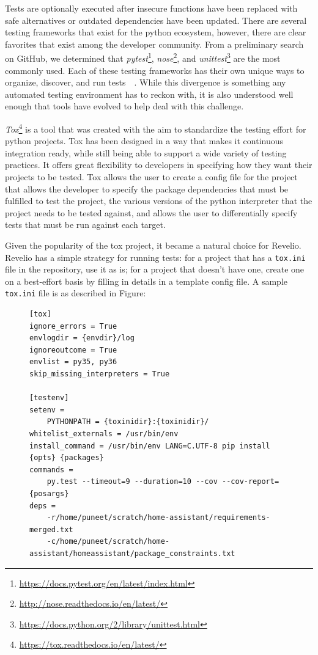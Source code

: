 Tests are optionally executed after insecure functions have been replaced with safe alternatives or outdated dependencies have been updated. There are several testing frameworks that exist for the python ecosystem, however, there are clear favorites that exist among the developer community. From a preliminary search on GitHub, we determined that \emph{pytest}\footnote{\url{https://docs.pytest.org/en/latest/index.html}}, \emph{nose}\footnote{\url{http://nose.readthedocs.io/en/latest/}}, and \emph{unittest}\footnote{\url{https://docs.python.org/2/library/unittest.html}} are the most commonly used. Each of these testing frameworks has their own unique ways to organize, discover, and run tests~\cite{nosetests}~\cite{pytests}. While this divergence is something any automated testing environment has to reckon with, it is also understood well enough that tools have evolved to help deal with this challenge.

\emph{Tox}\footnote{\url{https://tox.readthedocs.io/en/latest/}} is a tool that was created with the aim to standardize the testing effort for python projects. Tox has been designed in a way that makes it continuous integration ready, while still being able to support a wide variety of testing practices. It offers great flexibility to developers in specifying how they want their projects to be tested. Tox allows the user to create a config file for the project that allows the developer to specify the package dependencies that must be fulfilled to test the project, the various versions of the python interpreter that the project needs to be tested against, and allows the user to differentially specify tests that must be run against each target. 

Given the popularity of the tox project, it became a natural choice for Revelio. Revelio has a simple strategy for running tests: for a project that has a \texttt{tox.ini} file in the repository, use it as is; for a project that doesn't have one, create one on a best-effort basis by filling in details in a template config file. A sample \texttt{tox.ini} file is as described in Figure: 

\begin{figure}[!h]
    \centering
    \begin{lstlisting}[caption={Sample tox.ini file},captionpos=b, label={lst:tox}]
[tox]
ignore_errors = True
envlogdir = {envdir}/log
ignoreoutcome = True
envlist = py35, py36
skip_missing_interpreters = True

[testenv]
setenv =
    PYTHONPATH = {toxinidir}:{toxinidir}/
whitelist_externals = /usr/bin/env
install_command = /usr/bin/env LANG=C.UTF-8 pip install {opts} {packages}
commands =
    py.test --timeout=9 --duration=10 --cov --cov-report= {posargs}
deps =
    -r/home/puneet/scratch/home-assistant/requirements-merged.txt
    -c/home/puneet/scratch/home-assistant/homeassistant/package_constraints.txt
\end{lstlisting}
\end{figure}


